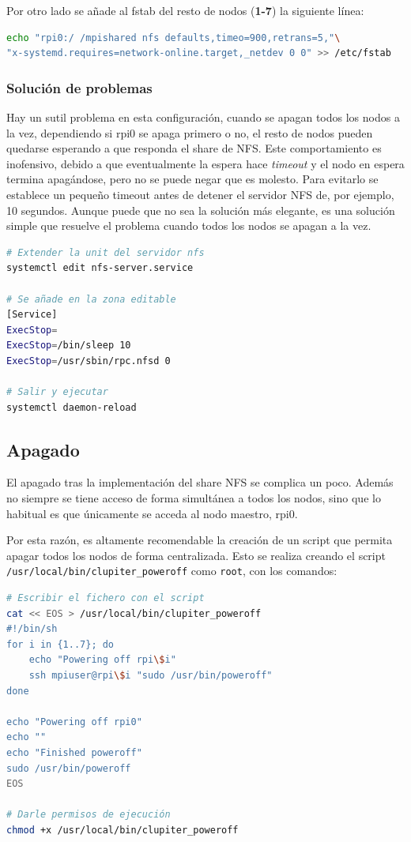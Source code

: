 Por otro lado se añade al fstab del resto de nodos (\textbf{1-7}) la siguiente línea:
\begin{lstlisting}[language=bash]
echo "rpi0:/ /mpishared nfs defaults,timeo=900,retrans=5,"\
"x-systemd.requires=network-online.target,_netdev 0 0" >> /etc/fstab
\end{lstlisting}

\subsubsection{Solución de problemas}
Hay un sutil problema en esta configuración, cuando se apagan todos los nodos a la vez, dependiendo si rpi0 se apaga primero o no, el resto de nodos pueden quedarse esperando a que responda el share de NFS. Este comportamiento es inofensivo, debido a que eventualmente la espera hace \textit{timeout} y el nodo en espera termina apagándose, pero no se puede negar que es molesto. Para evitarlo se establece un pequeño timeout antes de detener el servidor NFS de, por ejemplo, 10 segundos. Aunque puede que no sea la solución más elegante, es una solución simple que resuelve el problema cuando todos los nodos se apagan a la vez.

\begin{lstlisting}[language=bash]
# Extender la unit del servidor nfs
systemctl edit nfs-server.service

# Se añade en la zona editable
[Service]
ExecStop=
ExecStop=/bin/sleep 10
ExecStop=/usr/sbin/rpc.nfsd 0

# Salir y ejecutar
systemctl daemon-reload
\end{lstlisting}

\subsection{Apagado}
\label{ssec:apagado_impl}
El apagado tras la implementación del share NFS se complica un poco. Además no siempre se tiene acceso de forma simultánea a todos los nodos, sino que lo habitual es que únicamente se acceda al nodo maestro, rpi0.

Por esta razón, es altamente recomendable la creación de un script que permita apagar todos los nodos de forma centralizada. Esto se realiza creando el script \texttt{/usr/local/bin/clupiter\_poweroff} como \texttt{root}, con los comandos:

\begin{lstlisting}[language=bash]
# Escribir el fichero con el script
cat << EOS > /usr/local/bin/clupiter_poweroff
#!/bin/sh
for i in {1..7}; do
    echo "Powering off rpi\$i"
    ssh mpiuser@rpi\$i "sudo /usr/bin/poweroff"
done

echo "Powering off rpi0"
echo ""
echo "Finished poweroff"
sudo /usr/bin/poweroff
EOS

# Darle permisos de ejecución
chmod +x /usr/local/bin/clupiter_poweroff
\end{lstlisting}

